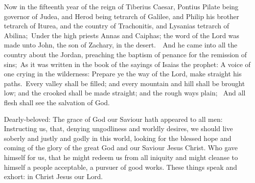 \medskip


Now in the fifteenth year of the reign of Tiberius Caesar, Pontius Pilate being
governor of Judea, and Herod being tetrarch of Galilee, and Philip his brother
tetrarch of Iturea, and the country of Trachonitis, and Lysanias tetrarch of
Abilina; Under the high priests Annas and Caiphas; the word of the Lord was
made unto John, the son of Zachary, in the desert.  And he came into all the
country about the Jordan, preaching the baptism of penance for the remission of
sins; As it was written in the book of the sayings of Isaias the prophet: A
voice of one crying in the wilderness: Prepare ye the way of the Lord, make
straight his paths. Every valley shall be filled; and every mountain and hill
shall be brought low; and the crooked shall be made straight; and the rough
ways plain;  And all flesh shall see the salvation of God.


\bigskip





Dearly-beloved: The grace of God our Saviour hath appeared to all men: Instructing us,
that, denying ungodliness and worldly desires, we should live soberly and
justly and godly in this world, looking for the blessed hope and coming of the
glory of the great God and our Saviour Jesus Christ.  Who gave himself for us,
that he might redeem us from all iniquity and might cleanse to himself a people
acceptable, a pursuer of good works.  These things speak and exhort: in Christ Jesus our Lord.

\medskip


